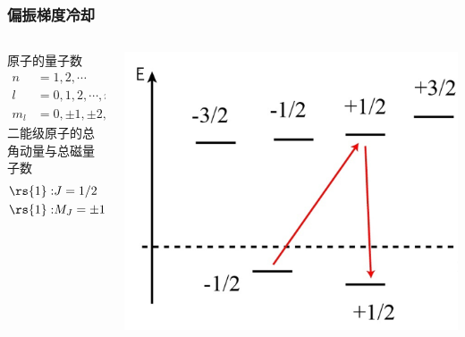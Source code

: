 \begin{frame} 
    \frametitle{偏振梯度冷却}
    \begin{columns}
        \begin{column}[t]{0.6\linewidth}
            原子的量子数
            \[ \begin{aligned}
                n & = 1, 2 , \cdots\\
                l & = 0, 1, 2, \cdots, n-1; \quad  s= 1/2 \\
                m_l & = 0, \pm 1 , \pm 2, \pm l, ; \quad  m_s= \pm 1/2 
            \end{aligned}\] 
            二能级原子的总角动量与总磁量子数 
            \[ \begin{aligned}
                \rs{1}: &J=1/2  \quad \quad \,\,\, \rs{2}: J=3/2 \\
                \rs{1}: &M_J=\pm 1/2 \quad \rs{2}: M_J =\pm 1/2,\pm 3/2
            \end{aligned}\] 
        \end{column}
        \begin{column}[t]{0.4\linewidth} 
           \begin{center}
                \includegraphics[width=1.0\textwidth]{figs/30.png}
           \end{center}
        \end{column}
    \end{columns}   
    \end{frame}

